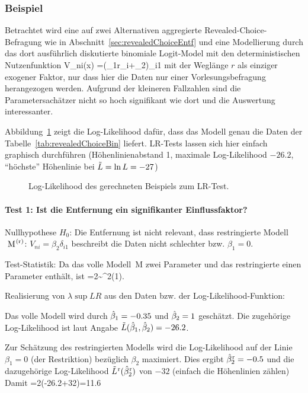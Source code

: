  
\subsubsection{Beispiel}
\label{bspLRGraph}
Betrachtet wird eine auf zwei Alternativen aggregierte
Revealed-Choice-Befragung wie in
Abschnitt~\ref{sec:revealedChoiceEntf} und eine Modellierung durch das
dort ausf\"uhrlich diskutierte 
 binomiale Logit-Model mit den deterministischen Nutzenfunktion
\bdm
V_{ni}(x) =(\beta_1r_i+\beta_2)\delta_{i1}
\edm
mit der 
Wegl\"ange $r$ als einziger
 exogener Faktor, nur dass hier die Daten nur
einer Vorlesungsbefragung herangezogen werden. Aufgrund der
kleineren Fallzahlen sind die Parametersach\"atzer nicht so hoch
signifikant wie dort und die Auswertung interessanter.  

Abbildung~\ref{fig:BNL_kalib_logL-LRTest} zeigt die Log-Likelihood daf\"ur, dass das
Modell genau die Daten der Tabelle~\ref{tab:revealedChoiceBin} liefert. LR-Tests
lassen sich hier einfach graphisch durchf\"uhren 
(H\"ohenlinien\-ab\-stand 1, maximale Log-Likelihood $-26.2$,
``h\"ochste'' H\"ohenlinie bei $\tilde{L}=\ln L=-27$)
 
\begin{figure}
\caption{\label{fig:BNL_kalib_logL-LRTest}Log-Likelihood des
  gerechneten Beispiels zum LR-Test.}
\end{figure}


\paragraph{Test 1: Ist die Entfernung ein signifikanter Einflussfaktor?}
\benum
\item Nullhypothese $H_0$: Die Entfernung ist nicht relevant, dass
  restringierte Modell ${\mbox{ M}}^{\!\!{\mbox{ \scriptsize{(r)}}}}$: $V_{ni}=\beta_2\delta_{i1}$ beschreibt die Daten nicht
  schlechter bzw. $\beta_1=0$.

\item Test-Statistik: Da das volle Modell~M zwei Parameter und das
  restringierte einen Parameter enth\"alt, ist
\bdm
\lambda{}=2 \sim \chi^2(1).
\edm
\item Realisierung von $\lambda\sup{LR}$ aus den Daten bzw. der
  Log-Likelihood-Funktion:
\bi
\item Das volle Modell wird durch $\hat{\beta}_1=-0.35$ und $\hat{\beta}_2=1$
gesch\"atzt. Die zugeh\"orige Log-Likelihood ist laut Angabe
$\tilde{L}(\hat{\beta}_1,\hat{\beta}_2)=-26.2$.
\item Zur Sch\"atzung des restringierten Modells wird die Log-Likelihood auf der
Linie $\beta_1=0$ (der Restriktion) bez\"uglich $\beta_2$ maximiert. Dies
ergibt $\hat{\beta}_2^{\!\!{\mbox{ \scriptsize{r}}}}=-0.5$ und die dazugeh\"orige Log-Likelihood 
$\tilde{L}^{\!\!{\mbox{ \scriptsize{r}}}}(\hat{\beta}_2^{\!\!{\mbox{ \scriptsize{r}}}})$ von $-32$ (einfach die H\"ohenlinien z\"ahlen)
\ei
Damit 
\bdm
\lambda{}=2(-26.2+32)=11.6
\edm

